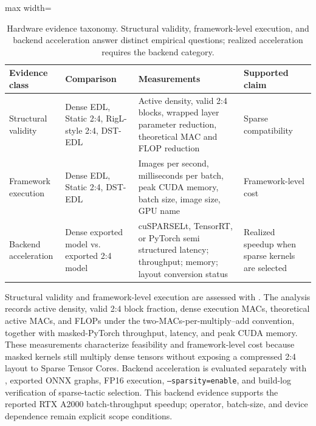 \documentclass[letterpaper]{article}
\begin{document}
\begin{table}[tbp]
\centering
\scriptsize
\caption{Hardware evidence taxonomy. Structural validity, framework-level execution, and backend acceleration answer distinct empirical questions; realized acceleration requires the backend category.}
\label{tab:hardware_protocol_ladder}
\setlength{\tabcolsep}{1.4pt}
\renewcommand{\arraystretch}{1.08}
\begin{adjustbox}{max width=\columnwidth}
\begin{tabular}{@{}p{}p{}p{}p{}@{}}
\toprule
\textbf{Evidence class} & \textbf{Comparison} & \textbf{Measurements} & \textbf{Supported claim} \\
\midrule
Structural validity & Dense EDL, Static 2:4, RigL-style 2:4, DST-EDL & Active density, valid 2:4 blocks, wrapped layer parameter reduction, theoretical MAC and FLOP reduction & Sparse compatibility \\
Framework execution & Dense EDL, Static 2:4, DST-EDL & Images per second, milliseconds per batch, peak CUDA memory, batch size, image size, GPU name & Framework-level cost \\
Backend acceleration & Dense exported model vs. exported 2:4 model & cuSPARSELt, TensorRT, or PyTorch semi structured latency; throughput; memory; layout conversion status & Realized speedup when sparse kernels are selected \\
\bottomrule
\end{tabular}
\end{adjustbox}
\end{table}

Structural validity and framework-level execution are assessed with . The analysis records active density, valid 2:4 block fraction, dense execution MACs, theoretical active MACs, and FLOPs under the two-MACs-per-multiply--add convention, together with masked-PyTorch throughput, latency, and peak CUDA memory. These measurements characterize feasibility and framework-level cost because masked kernels still multiply dense tensors without exposing a compressed 2:4 layout to Sparse Tensor Cores. Backend acceleration is evaluated separately with , exported ONNX graphs, FP16 execution, \texttt{--sparsity=enable}, and build-log verification of sparse-tactic selection. This backend evidence supports the reported RTX A2000 batch-throughput speedup; operator, batch-size, and device dependence remain explicit scope conditions.
\end{document}
